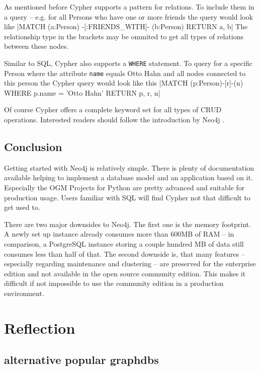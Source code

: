 As mentioned before Cypher supports a pattern for relations.
To include them in a query -- e.g. for all Persons who have one or more friends the query would look like |MATCH (a:Person) -[:FRIENDS_WITH]- (b:Person) RETURN a, b|
The relationship type in the brackets may be ommited to get all types of relations between these nodes.

Similar to SQL, Cypher also supports a \texttt{WHERE} statement.
To query for a specific Person where the attribute \texttt{name} equals \glqq Otto Hahn\grqq{} and all nodes connected to this person the Cypher query would look like this |MATCH (p:Person)-[r]-(n) WHERE p.name = 'Otto Hahn' RETURN p, r, n|

Of course Cypher offers a complete keyword set for all types of CRUD operations. Interested readers should follow the introduction by Neo4j \autocite{neo4j:cypher_introduction}.

\subsection{Conclusion}
Getting started with Neo4j is relatively simple.
There is plenty of documentation available helping to implement a database model and an application based on it.
Especially the OGM Projects for Python are pretty advanced and suitable for production usage.
Users familiar with SQL will find Cypher not that difficult to get used to.

There are two major downsides to Neo4j. The first one is the memory footprint.
A newly set up instance already consumes more than 600MB of RAM -- in comparison, a PostgreSQL instance storing a couple hundred MB of data still consumes less than half of that.
The second downside is, that many features -- especially regarding maintenance and clustering -- are preserved for the enterprise edition and not available in the open source community edition. This makes it difficult if not impossible to use the community edition in a production environment.

\section{Reflection} \label{section4}
\subsection{alternative popular graphdbs}
